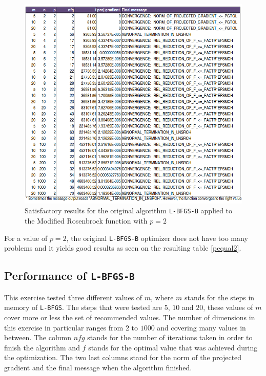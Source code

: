 \begin{figure}
\begin{center}
\includegraphics[scale=0.58]{Figures/Nocedalp2.png}
\caption[Modified Rosenbrock with $p = 2$]{Satisfactory results for the original algorithm \texttt{L-BFGS-B} applied to the Modified Rosenbrock function with $p = 2$}
\label{pequal2}
\end{center}
\end{figure}


For a value of $p = 2$, the original \texttt{L-BFGS-B} optimizer does not have too many problems and it yields good results as seen on the resulting table \eqref{pequal2}.

\subsection{Performance of \texttt{L-BFGS-B}}

This exercise tested three different values of $m$, where $m$ stands for the steps in memory of \texttt{L-BFGS}. The steps that were tested are $5$, $10$ and $20$, these values of $m$ cover more or less the set of recommended values. The number of dimensions in this exercise in particular ranges from $2$ to $1000$ and covering many values in between. The column $nfg$ stands for the number of iterations taken in order to finish the algorithm and $f$ stands for the optimal value that was achieved during the optimization. The two last columns stand for the norm of the projected gradient and the final message when the algorithm finished.

